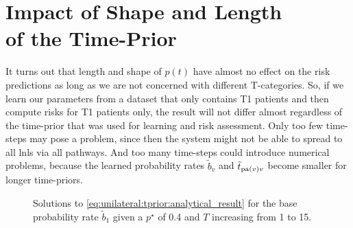 \documentclass[\relativeRoot/main.tex]{subfiles}
\begin{document}
\section[Impact of Shape and Length of the Time-Prior]{Impact of Shape and Length\\of the Time-Prior}
\label{sec:unilateral:tprior}

It turns out that length and shape of $p(t)$ have almost no effect on the risk predictions as long as we are not concerned with different T-categories. So, if we learn our parameters from a dataset that only contains T1 patients and then compute risks for T1 patients only, the result will not differ almost regardless of the time-prior that was used for learning and risk assessment. Only too few time-steps may pose a problem, since then the system might not be able to spread to all \glspl{lnl} via all pathways. And too many time-steps could introduce numerical problems, because the learned probability rates $\tilde{b}_v$ and $\tilde{t}_{\operatorname{pa}(v)v}$  become smaller for longer time-priors.

\begin{figure}
    \centering
    \def\svgwidth{0.7\textwidth}
    
    \caption[Analytic solutions for the decay of spread probability rates]{Solutions to \cref{eq:unilateral:tprior:analytical_result} for the base probability rate $\tilde{b}_1$ given a $p^{\star}$ of 0.4 and $T$ increasing from 1 to 15.}
    \label{fig:unilateral:tprior:rate_decay_analytic}
\end{figure}
\end{document}
